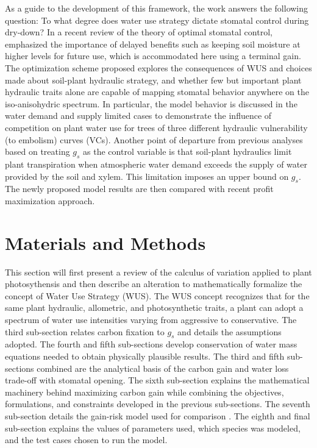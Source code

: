 \documentclass[utf8]{frontiersSCNS} %
\begin{document}
As a guide to the development of this framework, the work answers the following question: To what degree does water use strategy dictate stomatal control during dry-down? In a recent review of the theory of optimal stomatal control, \citet{buckley_optimal_2017} emphasized the importance of delayed benefits such as keeping soil moisture at higher levels for future use, which is accommodated here using a terminal gain. The optimization scheme proposed explores the consequences of WUS and choices made about soil-plant hydraulic strategy, and whether few but important plant hydraulic traits alone are capable of mapping stomatal behavior anywhere on the iso-anisohydric spectrum. In particular, the model behavior is discussed in the water demand and supply limited cases to demonstrate the influence of competition on plant water use for trees of three different hydraulic vulnerability (to embolism)  curves (VCs). Another point of departure from previous analyses based on treating $g_s$ as the control variable is that soil-plant hydraulics limit plant transpiration when atmospheric water demand exceeds the supply of water provided by the soil and xylem. This limitation imposes an upper bound on $g_s$. The newly proposed model results are then compared with recent profit maximization approach. 

\section{Materials and Methods}

This section will first present a review of the calculus of variation applied to plant photosythensis and then describe an alteration to mathematically formalize the concept of Water Use Strategy (WUS). The WUS concept recognizes that for the same plant hydraulic, allometric, and photosynthetic traits, a plant can adopt a spectrum of water use intensities varying from aggressive to conservative. The third sub-section relates carbon fixation to $g_s$ and details the assumptions adopted. The fourth and fifth sub-sections develop conservation of water mass equations needed to obtain physically plausible results. The third and fifth sub-sections combined are the analytical basis of the carbon gain and water loss trade-off with stomatal opening. The sixth sub-section explains the mathematical machinery behind maximizing carbon gain while combining the objectives, formulations, and constraints developed in the previous sub-sections. The seventh sub-section details the gain-risk model used for comparison \citep{sperry_what_2015,sperry_pragmatic_2016}. The eighth and final sub-section explains the values of parameters used, which species was modeled, and the test cases chosen to run the model.
\end{document}
